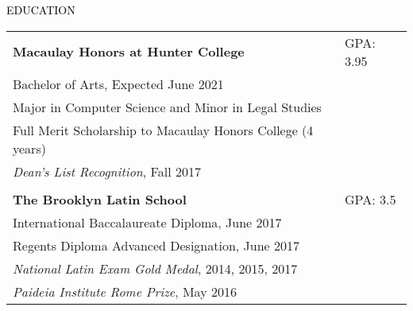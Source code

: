 \documentclass{resume} %
\renewenvironment{rSection}[1]{
  \sectionskip
  \textcolor{Black}{\MakeUppercase{#1}}
  \sectionlineskip
  \begin{list}{}{
      \setlength{\leftmargin}{1.5em}
    }
  \item[]
}{
  \end{list}
}
\begin{document}
\begin{rSection}{Education}

  \begin{tabular}{ @{} >{}l @{\hspace{-10ex}} l }
      {\bf Macaulay Honors at Hunter College} & GPA: 3.95
    \\ Bachelor of Arts, Expected June 2021
    \\ Major in Computer Science and Minor in Legal Studies
    \\ Full Merit Scholarship to Macaulay Honors College (4 years)
    \\ {\em Dean's List Recognition}, Fall 2017
    \\
    \\ {\bf The Brooklyn Latin School} & GPA: 3.5 
    \\ International Baccalaureate Diploma, June 2017
    \\ Regents Diploma Advanced Designation, June 2017
    \\ {\em National Latin Exam Gold Medal}, 2014, 2015, 2017
    \\ {\em Paideia Institute Rome Prize}, May 2016
  \end{tabular}

\end{rSection}
\end{document}
